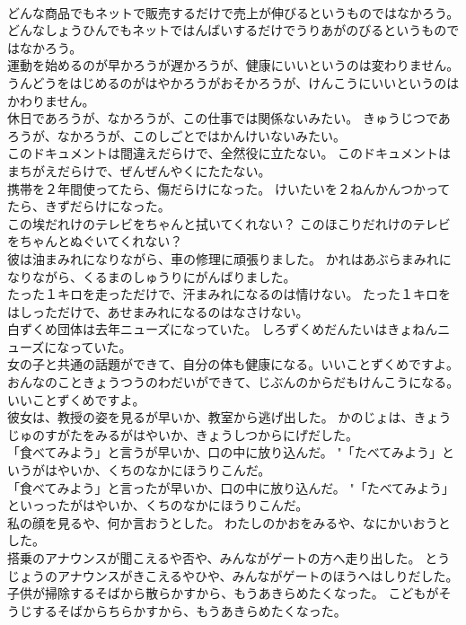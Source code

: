 \documentclass[8pt]{extreport}
\begin{document}
\begin{CJK}{UTF8}{min}
\\	どんな商品でもネットで販売するだけで売上が伸びるというものではなかろう。	どんなしょうひんでもネットではんばいするだけでうりあがのびるというものではなかろう。 
\\	運動を始めるのが早かろうが遅かろうが、健康にいいというのは変わりません。	うんどうをはじめるのがはやかろうがおそかろうが、けんこうにいいというのはかわりません。 
\\	休日であろうが、なかろうが、この仕事では関係ないみたい。	きゅうじつであろうが、なかろうが、このしごとではかんけいないみたい。 
\\	このドキュメントは間違えだらけで、全然役に立たない。	このドキュメントはまちがえだらけで、ぜんぜんやくにたたない。 
\\	携帯を２年間使ってたら、傷だらけになった。	けいたいを２ねんかんつかってたら、きずだらけになった。 
\\	この埃だれけのテレビをちゃんと拭いてくれない？	このほこりだれけのテレビをちゃんとぬぐいてくれない？ 
\\	彼は油まみれになりながら、車の修理に頑張りました。	かれはあぶらまみれになりながら、くるまのしゅうりにがんばりました。 
\\	たった１キロを走っただけで、汗まみれになるのは情けない。	たった１キロをはしっただけで、あせまみれになるのはなさけない。 
\\	白ずくめ団体は去年ニューズになっていた。	しろずくめだんたいはきょねんニューズになっていた。 
\\	女の子と共通の話題ができて、自分の体も健康になる。いいことずくめですよ。	おんなのこときょうつうのわだいができて、じぶんのからだもけんこうになる。いいことずくめですよ。 
\\	彼女は、教授の姿を見るが早いか、教室から逃げ出した。	かのじょは、きょうじゅのすがたをみるがはやいか、きょうしつからにげだした。 
\\	「食べてみよう」と言うが早いか、口の中に放り込んだ。	"「たべてみよう」というがはやいか、くちのなかにほうりこんだ。 
\\	「食べてみよう」と言ったが早いか、口の中に放り込んだ。	"「たべてみよう」といっったがはやいか、くちのなかにほうりこんだ。 
\\	私の顔を見るや、何か言おうとした。	わたしのかおをみるや、なにかいおうとした。 
\\	搭乗のアナウンスが聞こえるや否や、みんながゲートの方へ走り出した。	とうじょうのアナウンスがきこえるやひや、みんながゲートのほうへはしりだした。 
\\	子供が掃除するそばから散らかすから、もうあきらめたくなった。	こどもがそうじするそばからちらかすから、もうあきらめたくなった。 

\end{CJK}
\end{document}
